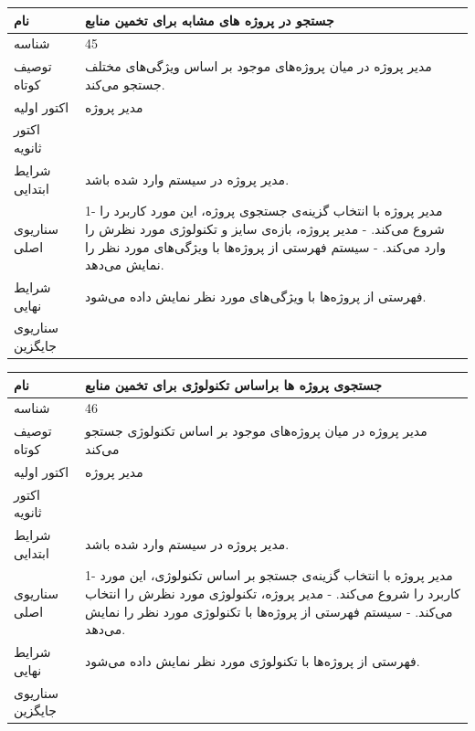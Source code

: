 \documentclass{article}
\begin{document}
\vspace{2cm}

\begin{tabular}{|p{2cm}|p{10cm}|}
\hline
نام
&
جستجو در پروژه های مشابه برای تخمین منابع
\\
\hline
شناسه
&
45
\\
\hline
توصیف کوتاه
&
مدیر پروژه در میان پروژه‌های موجود بر اساس ویژگی‌های مختلف جستجو می‌کند.
\\
\hline
اکتور اولیه
&
مدیر پروژه
\\
\hline
اکتور ثانویه
&

\\
\hline
شرایط ابتدایی
&
مدیر پروژه در سیستم وارد شده باشد.
\\
\hline
سناریوی اصلی
&
1- مدیر پروژه با انتخاب گزینه‌ی جستجوی پروژه، این مورد کاربرد را شروع می‌کند.
\newline
2- مدیر پروژه، بازه‌ی سایز و تکنولوژی مورد نظرش را وارد می‌کند.
\newline
3- سیستم فهرستی از پروژه‌ها با ویژگی‌های مورد نظر را نمایش می‌دهد.
\\
\hline
شرایط نهایی
&
فهرستی از پروژه‌ها با ویژگی‌های مورد نظر نمایش داده می‌شود.
\\
\hline
سناریوی جایگزین
&

\\
\hline
\end{tabular}

\vspace{2cm}

\begin{tabular}{|p{2cm}|p{10cm}|}
\hline
نام
&
جستجوی پروژه ها براساس تکنولوژی برای تخمین منابع
\\
\hline
شناسه
&
46
\\
\hline
توصیف کوتاه
&
مدیر پروژه در میان پروژه‌های موجود بر اساس تکنولوژی جستجو می‌کند 
\\
\hline
اکتور اولیه
&
مدیر پروژه
\\
\hline
اکتور ثانویه
&

\\
\hline
شرایط ابتدایی
&
مدیر پروژه در سیستم وارد شده باشد.
\\
\hline
سناریوی اصلی
&
1- مدیر پروژه با انتخاب گزینه‌ی جستجو بر اساس تکنولوژی، این مورد کاربرد را شروع می‌کند.
\newline
2- مدیر پروژه، تکنولوژی مورد نظرش را انتخاب می‌کند.
\newline
3- سیستم فهرستی از پروژه‌ها با تکنولوژی مورد نظر را نمایش می‌دهد.
\\
\hline
شرایط نهایی
&
فهرستی از پروژه‌ها با تکنولوژی مورد نظر نمایش داده می‌شود.
\\
\hline
سناریوی جایگزین
&

\\
\hline
\end{tabular}
\end{document}
